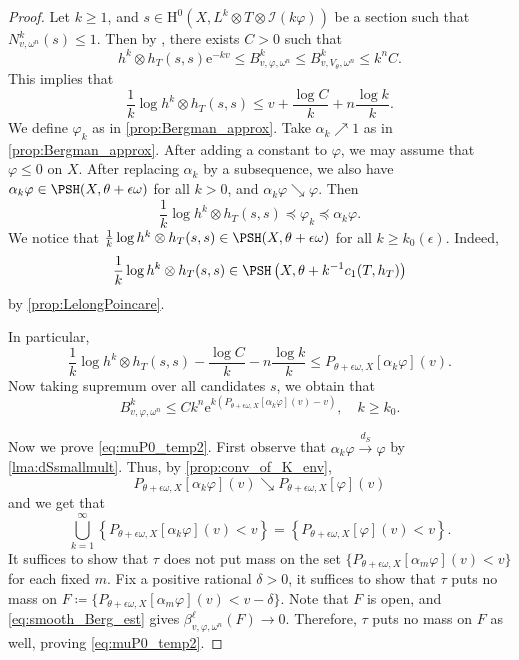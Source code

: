 \begin{proof}
Let $k\geq 1$, and $s \in \mathrm{H}^0(X,L^k \otimes T \otimes \mathcal I(k\varphi))$ be a section such that $N^k_{v,\omega^n}(s) \leq 1$. Then by \cite[Lemma~4.1]{Ber11}, there exists $C>0$ such that
\[
h^k\otimes h_T(s,s)\mathrm{e}^{-kv} \leq B^k_{v,\varphi,\omega^n} \leq B^k_{v,V_{\theta},\omega^n} \leq k^n C.
\]
This implies that
\[
\frac{1}{k}\log h^k \otimes h_T(s,s) \leq v + \frac{\log C }{k} + n \frac{\log k}{ k }.
\]
We define $\varphi_k$ as in \cref{prop:Bergman_approx}. Take $\alpha_k\nearrow 1$ as in \cref{prop:Bergman_approx}.
After adding a constant to $\varphi$, we may assume that $\varphi\leq 0$ on $X$. After replacing $\alpha_k$ by a subsequence, we also have $\alpha_k\varphi\in \PSH(X,\theta+\epsilon\omega)$ for all $k>0$, and $\alpha_k\varphi\searrow\varphi$.
Then
\[
\frac{1}{k}\log h^k \otimes h_T(s,s)\preceq \varphi_k\preceq \alpha_k\varphi.
\]
We notice that $\frac{1}{k}\log h^k \otimes h_T(s,s) \in \PSH(X, \theta + \epsilon \omega)$ for all $k \geq k_0(\epsilon)$.
Indeed,
\[
    \frac{1}{k}\log h^k\otimes h_T(s,s) \in \PSH\left(X,\theta+ k^{-1} c_1(T,h_T)\right)
\]
by \cref{prop:LelongPoincare}.


In particular,
\[
\frac{1}{k}\log h^k \otimes h_T(s,s)-\frac{\log C}{k}-n\frac{\log k}{k}\leq P_{\theta+\epsilon\omega,X}[\alpha_k \varphi](v).
\]
Now taking supremum over all candidates $s$, we obtain that
\begin{equation}\label{eq:smooth_Berg_est}
B^k_{v,\varphi,\omega^n} \leq C k^n \mathrm{e}^{k \left(P_{\theta +\epsilon \omega,X}[\alpha_k \varphi](v)-v\right)},\quad k \geq k_0.
\end{equation}

Now we prove \eqref{eq:muP0_temp2}. First observe that $\alpha_k\varphi\xrightarrow{d_S}\varphi$ by \cref{lma:dSsmallmult}. Thus, by \cref{prop:conv_of_K_env},
\[
P_{\theta +\epsilon \omega,X}[\alpha_k \varphi](v) \searrow P_{\theta +\epsilon \omega,X}[\varphi](v)
\]
and we get that
\[
\bigcup_{k=1}^{\infty}\left\{P_{\theta +\epsilon \omega,X}[\alpha_k \varphi](v) < v\right\}=\left\{P_{\theta +\epsilon \omega,X}[\varphi](v) < v\right\}.
\]
    It suffices to show that $\tau$ does not put mass on the set $\{P_{\theta +\epsilon \omega,X}[\alpha_m \varphi](v) < v\}$ for each fixed $m$. Fix a positive rational $\delta>0$, it suffices to show that $\tau$ puts no mass on $F\coloneqq \{P_{\theta +\epsilon \omega,X}[\alpha_m \varphi](v) < v-\delta\}$.
    Note that $F$ is open, and \eqref{eq:smooth_Berg_est} gives $\beta^\ell_{v,\varphi,\omega^n}(F)\to 0$. Therefore, $\tau$ puts no mass on $F$ as well, proving \eqref{eq:muP0_temp2}.
\end{proof}



